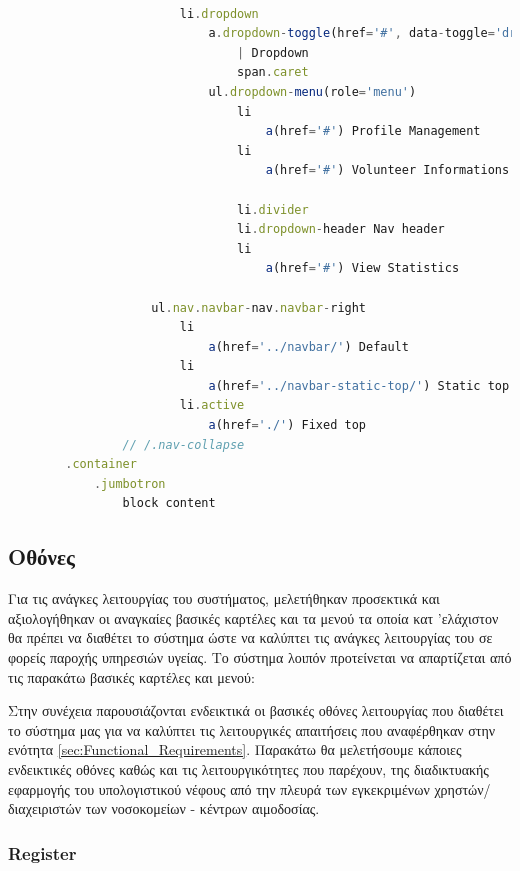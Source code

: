 \begin{lstlisting}[language=Javascript]
						                                                 
                        li.dropdown
                            a.dropdown-toggle(href='#', data-toggle='dropdown')
                                | Dropdown
                                span.caret
                            ul.dropdown-menu(role='menu')
                                li
                                    a(href='#') Profile Management
                                li
                                    a(href='#') Volunteer Informations

                                li.divider
                                li.dropdown-header Nav header
                                li
                                    a(href='#') View Statistics

                    ul.nav.navbar-nav.navbar-right
                        li
                            a(href='../navbar/') Default
                        li
                            a(href='../navbar-static-top/') Static top
                        li.active
                            a(href='./') Fixed top
                // /.nav-collapse
        .container
            .jumbotron
                block content

		\end{lstlisting}

		
	\subsection{Οθόνες}
	
		Για τις ανάγκες λειτουργίας του συστήματος, μελετήθηκαν προσεκτικά και αξιολογήθηκαν οι αναγκαίες βασικές καρτέλες και τα μενού τα οποία κατ 'ελάχιστον θα πρέπει να διαθέτει το σύστημα ώστε να καλύπτει τις ανάγκες λειτουργίας του σε φορείς παροχής υπηρεσιών υγείας. Το σύστημα λοιπόν προτείνεται να απαρτίζεται από τις παρακάτω βασικές καρτέλες και μενού:

		Στην συνέχεια παρουσιάζονται ενδεικτικά οι βασικές οθόνες λειτουργίας που διαθέτει το σύστημα μας για να καλύπτει τις λειτουργικές απαιτήσεις που αναφέρθηκαν στην ενότητα \ref{sec:Functional_Requirements}. Παρακάτω θα μελετήσουμε κάποιες ενδεικτικές οθόνες καθώς και τις λειτουργικότητες που παρέχουν, της διαδικτυακής εφαρμογής του υπολογιστικού νέφους από την πλευρά των εγκεκριμένων χρηστών/διαχειριστών των νοσοκομείων - κέντρων αιμοδοσίας. 
	
		\subsubsection{Register}
		

